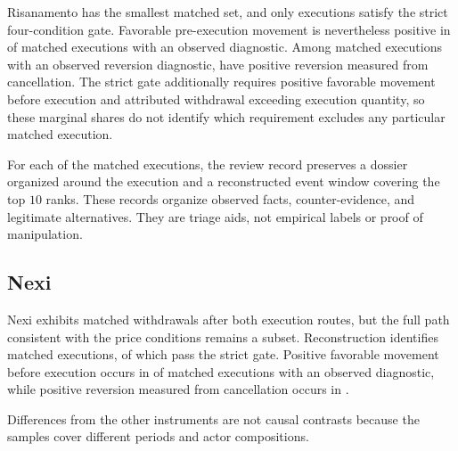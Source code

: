 \documentclass[11pt]{article}
\newenvironment{review}{\begingroup\color{blue}}{\endgroup}
\begin{document}
Risanamento has the smallest matched set, and only \RisanamentoCompatibleSequences{} executions satisfy the strict
four-condition gate. Favorable pre-execution movement is nevertheless positive in \RisanamentoFPMShare{} of matched executions
with an observed diagnostic. Among matched executions with an observed reversion diagnostic, \RisanamentoREVShare{} have
\begin{review}positive reversion measured from cancellation\end{review}. The strict gate additionally requires \begin{review}positive favorable movement before execution\end{review} and
attributed withdrawal exceeding execution quantity, so these marginal shares do not identify which requirement excludes any
particular matched execution.

For each of the \RisanamentoMatchedClusters{} matched executions, the review record preserves \begin{review}a dossier organized around the execution and a reconstructed event window covering the top $10$ ranks\end{review}. These records organize observed facts, counter-evidence, and legitimate alternatives.
They are triage aids, not empirical labels or proof of manipulation.

\subsection{Nexi}
\label{subsec:nexi_results}

Nexi exhibits matched withdrawals after both execution routes, but \begin{review}the full path consistent with the price conditions\end{review} remains a subset.
Reconstruction identifies \NexiMatchedClusters{} matched executions, of which \NexiCompatibleSequences{} pass the strict gate.
Positive \begin{review}favorable movement before execution\end{review} occurs in \NexiFPMShare{} of matched executions with an observed diagnostic, while
\begin{review}positive reversion measured from cancellation\end{review} occurs in \NexiREVShare{}.

Differences from the other instruments are not causal contrasts because the samples cover different periods and actor
compositions.
\end{document}
